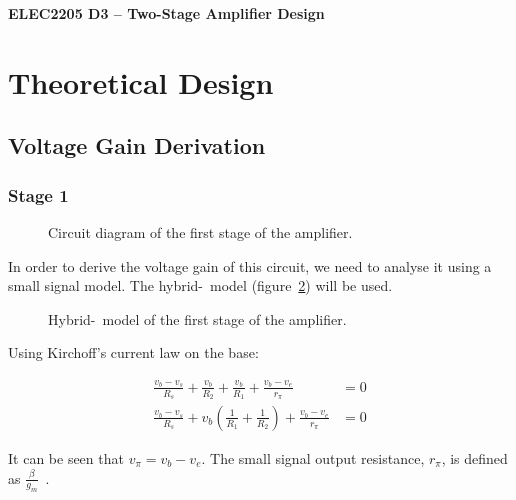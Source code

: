 \documentclass[a4paper,11pt]{article}
\begin{document}
  
\begin{center}
{\Large{\textbf{ELEC2205 D3 -- Two-Stage Amplifier Design}}} \\ [\baselineskip]

\end{center}

\begin{abstract}
\end{abstract}

\tableofcontents
\newpage

\section{Theoretical Design}
\subsection{Voltage Gain Derivation}
\subsubsection{Stage 1}

\begin{figure}[h]
\centering
    
    \caption{Circuit diagram of the first stage of the amplifier.}
    \label{fig:stage1}
\end{figure}

In order to derive the voltage gain of this circuit, we need to analyse it using a small signal model. The hybrid-\textpi\ model (figure~\ref{fig:stage1hpi}) will be used.

\begin{figure}[h]
\centering
    
    \caption{Hybrid-\textpi\ model of the first stage of the amplifier.}
    \label{fig:stage1hpi}
\end{figure}

Using Kirchoff's current law on the base:

\begin{subequations}
\begin{align}
\frac{v_b - v_s}{R_s} + \frac{v_b}{R_2} + \frac{v_b}{R_1} + \frac{v_b - v_e}{r_\pi} &= 0\\
\frac{v_b - v_s}{R_s} + v_b \left(\frac{1}{R_1} + \frac{1}{R_2} \right) + \frac{v_b - v_e}{r_\pi} &= 0 \label{eq:kclBase}
\end{align}
\end{subequations}

It can be seen that $v_\pi = v_b - v_e$. The small signal output resistance, $r_\pi$, is defined as $\frac{\beta}{g_m}$~\cite[p. 29]{ADAIC}.
\end{document}
